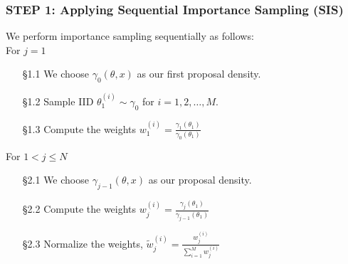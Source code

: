 \documentclass[aspectratio=169]{beamer}\usepackage[utf8]{inputenc}
\begin{document}
\begin{frame}\frametitle{STEP 1: Applying Sequential Importance Sampling  (SIS)  }
  We perform importance sampling sequentially as follows:\\
  For $j=1$
\begin{enumerate}
\item[§1.1]  We choose  $\gamma_{0}(\theta , x)$  as our first proposal density.
\item[§1.2] Sample IID $\theta_1^{(i)} \sim \gamma_{0}$  for $i =1,2,\ldots, M$.
\item[§1.3] Compute the weights $w^{(i)}_1= \frac{\gamma_1(\theta_1)}{\gamma_0(\theta_1)}$
\end{enumerate}
For  $1< j \leq N$
\begin{enumerate}
\item[§2.1]  We choose  $\gamma_{j-1}(\theta , x)$  as our  proposal density.
\item[§2.2] Compute the weights $w^{(i)}_j= \frac{\gamma_{j}(\theta_1)}{\gamma_{j-1}(\theta_1)}$
\item[§2.3] Normalize the weights, $\tilde{w}^{(i)}_j = \frac{w^{(i)}_j}{\sum_{i=1}^M w^{(i)}_j}$ 
\end{enumerate}
\end{frame}
\end{document}
